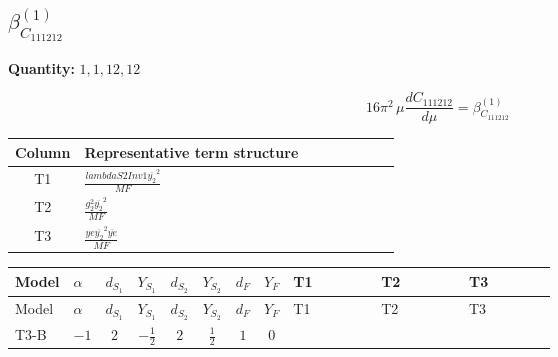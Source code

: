 \documentclass[8pt]{article}
\begin{document}
\begin{landscape}
\section*{$\beta_{C_{111212}}^{(1)}$}
\noindent\textbf{Quantity: }$\mathrm{1,1,12,12}$\par\smallskip
\[16\pi^2\,\mu\frac{d C_{111212}}{d\mu}=\beta_{C_{111212}}^{(1)}\]
\begin{center}
\begin{tabular}{@{}c >{\raggedright\arraybackslash}p{0.82\linewidth}@{}}
\toprule
Column & Representative term structure \\
\midrule
T1 & \(\displaystyle \frac{lambdaS2Inv1 \overline{y_{2}}^{2}}{MF}\) \\
\midrule
T2 & \(\displaystyle \frac{g_{2}^{2} \overline{y_{2}}^{2}}{MF}\) \\
\midrule
T3 & \(\displaystyle \frac{ye \overline{y_{2}}^{2} \overline{ye}}{MF}\) \\
\midrule
\bottomrule
\end{tabular}
\end{center}
\smallskip
\tiny
\begin{longtable}{@{}llcccccc >{\raggedright\arraybackslash}p{0.21\linewidth} >{\raggedright\arraybackslash}p{0.21\linewidth} >{\raggedright\arraybackslash}p{0.21\linewidth}@{}}
\toprule
Model & $\alpha$ & $d_{S_1}$ & $Y_{S_1}$ & $d_{S_2}$ & $Y_{S_2}$ & $d_F$ & $Y_F$ & T1 & T2 & T3 \\
\midrule
\endfirsthead
\toprule
Model & $\alpha$ & $d_{S_1}$ & $Y_{S_1}$ & $d_{S_2}$ & $Y_{S_2}$ & $d_F$ & $Y_F$ & T1 & T2 & T3 \\
\midrule
\endhead
T3-B & $-1$ & $2$ & $-\frac{1}{2}$ & $2$ & $\frac{1}{2}$ & $1$ & $0$ & \scriptsize\adjustbox{max width=\linewidth}{$\begin{gathered} \frac{lambdaS2Inv1 \overline{y_{2}}^{2}}{2 MF}\end{gathered}$} & \scriptsize\adjustbox{max width=\linewidth}{$\begin{gathered} \frac{3 g_{2}^{2} \overline{y_{2}}^{2}}{4 MF}\end{gathered}$} & \scriptsize\adjustbox{max width=\linewidth}{$\begin{gathered} - \frac{ye \overline{y_{2}}^{2} \overline{ye}}{4 MF}\end{gathered}$} \\
\midrule
\bottomrule
\end{longtable}
\clearpage

\end{landscape}
\end{document}
